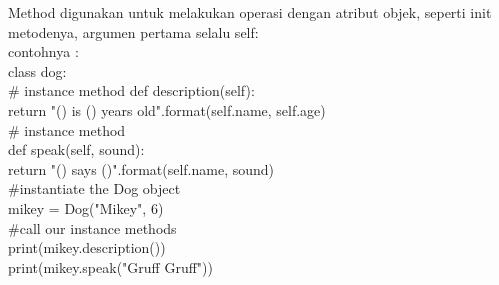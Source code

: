 \-Method digunakan untuk melakukan operasi dengan atribut objek, seperti init metodenya, argumen pertama selalu self:\\
contohnya :\\
class dog:\\
\# instance method
	def description(self):\\
		return "() is () years old".format(self.name, self.age)\\
\# instance method\\
	def speak(self, sound):\\
		return "() says ()".format(self.name, sound)\\
\#instantiate the Dog object\\
mikey = Dog("Mikey", 6)\\
\#call our instance methods\\
print(mikey.description())\\
print(mikey.speak("Gruff Gruff"))\\

